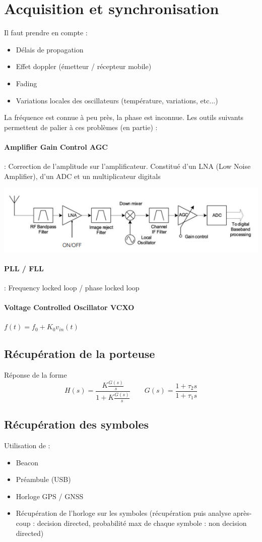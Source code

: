 \documentclass[resume]{subfiles}
\begin{document}
\section{Acquisition et synchronisation}
Il faut prendre en compte :
\begin{itemize}
\item Délais de propagation
\item Effet doppler (émetteur / récepteur mobile)
\item Fading
\item Variations locales des oscillateurs (température, variations, etc...)
\end{itemize}
La fréquence est connue à peu près, la phase est inconnue. Les outils suivants permettent de palier à ces problèmes (en partie) :
\paragraph{Amplifier Gain Control AGC} : Correction de l'amplitude sur l'amplificateur. Constitué d'un LNA (Low Noise Amplifier), d'un ADC et un multiplicateur digitals
\begin{center}
\includegraphics[width=\columnwidth]{img_1.png}
\end{center}
\paragraph{PLL / FLL} : Frequency locked loop / phase locked loop
\paragraph{Voltage Controlled Oscillator VCXO} $f(t)=f_0+K_0v_{in}(t)$
\subsection{Récupération de la porteuse}
Réponse de la forme
$$H(s)=\frac{K\frac{G(s)}{s}}{1+K\frac{G(s)}{s}}\qquad G(s)=\frac{1+\tau_2 s}{1+\tau_1 s}$$
\subsection{Récupération des symboles}
Utilisation de :
\begin{itemize}
\item Beacon
\item Préambule (USB)
\item Horloge GPS / GNSS
\item Récupération de l'horloge sur les symboles (récupération puis analyse après-coup : decision directed, probabilité max de chaque symbole : non decision directed)
\end{itemize}
\end{document}

